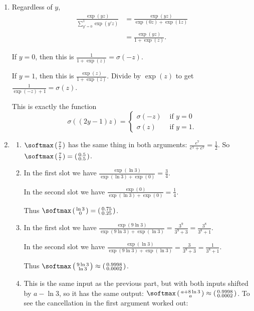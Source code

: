 \documentclass{article}
\newcommand{\twovector}[2]{ \begin{smallmatrix} #1 \\ #2 \end{smallmatrix} }
\newcommand{\ptwovector}[2]{ \left( \twovector{#1}{#2} \right) }
\begin{document}
\begin{enumerate}
\item \label{DFN_ex_bernoulli_solution} 
Regardless of $y$, 
\begin{align*}
        \frac{\exp(yz)}{\sum_{y' = 0}^1 \exp(y'z)} 
    & = \frac{\exp(yz)}{\exp(0z) + \exp(1z)}  \\
    & = \frac{\exp(yz)}{1        + \exp(z)}.
\end{align*}

If $y = 0$, then this is $\frac{1}      {1 + \exp(z)} = \sigma(-z)$.

If $y = 1$, then this is $\frac{\exp(z)}{1 + \exp(z)}$. Divide by $\exp(z)$ to get $\frac{1}{\exp(-z) + 1} = \sigma(z)$.

This is exactly the function 
\begin{equation*}
    \sigma((2y-1)z) = \begin{cases} \sigma(-z) & \text{ if } y = 0 \\ 
                                    \sigma(z)  & \text{ if } y = 1.
                      \end{cases}
\end{equation*}

\item \label{DFN_ex_softmax_solution} 
\begin{enumerate}
    \item $\softmax \ptwovector{7}{7}$ has the same thing in both arguments: $\frac{e^7}{e^7 + e^7} = \frac12$. So $\softmax \ptwovector{7}{7} = \ptwovector{0.5}{0.5}$.
    \item In the first slot we have $\frac{\exp(\ln 3)}{\exp(\ln 3) + \exp(0)} = \frac{3}{4}$. 
    
    In the second slot we have $\frac{\exp(0)}{\exp(\ln 3) + \exp(0)} = \frac{1}{4}$.
    
    Thus $\softmax\ptwovector{\ln 3}{0} = \ptwovector{0.75}{0.25}$.
    
    \item In the first slot we have $\frac{\exp(9 \ln 3)}{\exp(9 \ln 3) + \exp(\ln 3)} = \frac{3^9}{3^9 + 3} = \frac{3^8}{3^8+1}$.
    
    In the second slot we have $\frac{\exp(\ln 3)}{\exp(9 \ln 3) + \exp(\ln 3)} = \frac{3}{3^9 + 3} = \frac{1}{3^8+1}$.
    
    Thus $\softmax \ptwovector{9\ln 3}{\ln 3} \approx \ptwovector{0.9998}{0.0002}$.
    
    \item This is the same input as the previous part, but with both inputs shifted by $a - \ln 3$, so it has the same output: $\softmax \ptwovector{a + 8\ln 3}{a} \approx \ptwovector{0.9998}{0.0002}$. To see the cancellation in the first argument worked out:
    

\end{enumerate}
\end{enumerate}
\end{document}
